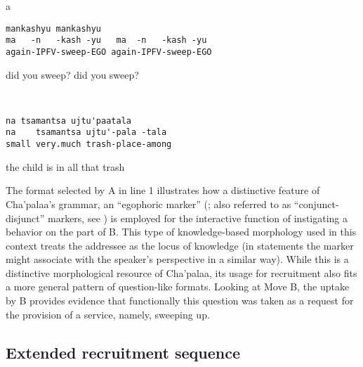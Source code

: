 \documentclass[output=paper]{langsci/langscibook}
\begin{document}
\vspace{-1mm}
%
\begin{mdframednoverticalspace}[style=firstfoc]
\begin{transbox}{1}{a}
\begin{verbatim}
mankashyu mankashyu
ma   -n   -kash -yu   ma  -n   -kash -yu
again-IPFV-sweep-EGO again-IPFV-sweep-EGO
\end{verbatim}
did you sweep? did you sweep?
\end{transbox}
\end{mdframednoverticalspace}
%
\begin{transbox}{2}{~}
\begin{verbatim}
na tsamantsa ujtu'paatala
na    tsamantsa ujtu'-pala -tala
small very.much trash-place-among
\end{verbatim}
the child is in all that trash
\end{transbox}
%
\begin{mdframednoverticalspace}[style=secondfoc]
\end{mdframednoverticalspace}
%
\vspace{-1mm}
%
\begin{mdframednoverticalspace}[style=secondfoc]
\end{mdframednoverticalspace}

\normalsize
The format selected by A in line 1 illustrates how a distinctive feature of Cha’pa\-laa’s grammar, an “egophoric marker” (\citealt{FloydNorcliffeSanRoque2018}; also referred to as “conjunct-disjunct” markers, see \citealt{Hale1980,DeLancey1992,Bickel2000,Creissels2008,Dickinson2000,Post2013}) is employed for the interactive function of instigating a behavior on the part of B. This type of knowledge-based morphology used in this context treats the addressee as the locus of knowledge (in statements the marker might associate with the speaker’s perspective in a similar way). While this is a distinctive morphological resource of Cha’palaa, its usage for recruitment also fits a more general pattern of question-like formats. Looking at Move B, the uptake by B provides evidence that functionally this question was taken as a request for the provision of a service, namely, sweeping up.

\subsection{Extended recruitment sequence}\label{sec:floyd:2.2}
\end{document}
